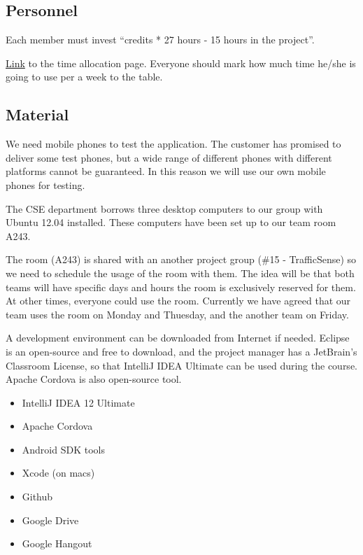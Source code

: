 \subsection{Personnel}

Each member must invest ``credits * 27 hours - 15 hours in the project''.

\href{https://docs.google.com/spreadsheet/ccc?key=0Ahu59q_GwtcedHI3MnJQM0NWZS11a
GxFTzFZeVEyQVE&usp=sharing}{Link} to the time allocation page. Everyone should 
mark how much time he/she is going to use per a week to the table.

\subsection{Material}

We need mobile phones to test the application. The customer has promised to
deliver some test phones, but a wide range of different phones with different
platforms cannot be guaranteed. In this reason we will use our own mobile phones 
for testing.

The CSE department borrows three desktop computers 
to our group with Ubuntu 12.04 installed. These computers have been set up
to our team room A243.

The room (A243) is shared with an another project group (\#15 -  TrafficSense)
so we need to schedule the usage of the room with them. The idea  will be that
both teams will have specific days and hours the room is  exclusively reserved
for them. At other times, everyone could use the room. Currently we have
agreed that our team uses the room on Monday and Thuesday, and the another
team on Friday.

A development environment can be downloaded from Internet if needed. Eclipse is
an open-source and free to download, and the project manager has a JetBrain's
Classroom License, so that IntelliJ IDEA Ultimate can be used during the course.
Apache Cordova is also open-source tool.

\begin{itemize}
\item IntelliJ IDEA 12 Ultimate
\item Apache Cordova
\item Android SDK tools
\item Xcode (on macs)
\item Github
\item Google Drive
\item Google Hangout
\end{itemize}


